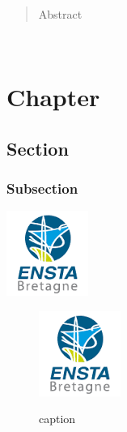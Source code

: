 \documentclass[a4paper]{report}
\begin{document}
\newpage
~
\thispagestyle{empty}
\newpage

\begin{abstract}

	Abstract

\end{abstract}

\tableofcontents

\newpage

\listoffigures
\thispagestyle{empty}
\setcounter{page}{0}

\newpage

\renewcommand{\arraystretch}{1.5}


~
\thispagestyle{empty}
\setcounter{page}{0}
\newpage

\chapter{Chapter}
\section{Section}
\subsection{Subsection}

	\begin{center}
		\includegraphics[scale=0.5]{image/logo_ensta.png}
	\end{center}

	\begin{figure}[!h]
		\centering
		\includegraphics[scale=0.5]{image/logo_ensta.png}\\
		\caption{caption}
	\end{figure} %
\end{document}
